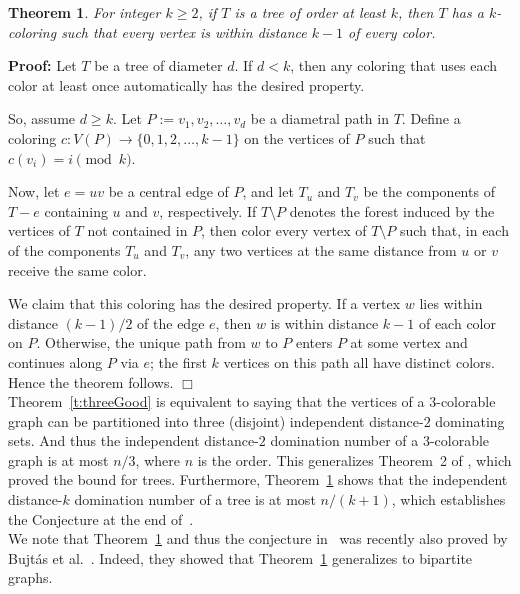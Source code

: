 \documentclass[a4paper,11pt]{article}
\newtheorem{theorem}{Theorem}[section]
\numberwithin{equation}{theorem}
\begin{document}
\begin{theorem}  \label{t:treeGood}
For integer $k\ge 2$,
if $T$ is a tree of order at least $k$, then $T$ has a $k$-coloring 
such that every vertex is within distance $k-1$ of every color.
\end{theorem}

{\bf Proof:} 
Let $T$ be a tree of diameter $d$. If $d < k$, then any coloring that uses each color at least once automatically has the desired property. 

So, assume $d \geq k$. Let $P := v_1, v_2, \ldots, v_d$ be a diametral path in $T$.  
Define a coloring $c : V(P) \to \{0, 1, 2, \ldots, k-1\}$ on the vertices of $P$ such that $c(v_i) = i \pmod{k}$.

Now, let $e = uv$ be a central edge of $P$, and let $T_u$ and $T_v$ be the components of $T - e$ containing $u$ and $v$, respectively.  
If $T \setminus P$ denotes the forest induced by the vertices of $T$ not contained in $P$, then color every vertex of $T \setminus P$ such that, in each of the components $T_u$ and $T_v$, any two vertices at the same distance from $u$ or $v$ receive the same color.

We claim that this coloring has the desired property.  
If a vertex $w$ lies within distance $(k-1)/2$ of the edge $e$, then $w$ is within distance $k-1$ of each color on $P$.  
Otherwise, the unique path from $w$ to $P$ enters $P$ at some vertex and continues along $P$ via $e$; the first $k$ vertices on this path all have distinct colors.  
Hence the theorem follows. \hfill$\Box$\\

Theorem~\ref{t:threeGood} is  equivalent to saying that the vertices of a $3$-colorable graph can be partitioned into 
three (disjoint) independent distance-$2$ dominating sets. And thus the independent distance-$2$ domination
number of a $3$-colorable graph is at most $n/3$, where $n$ is the order.  
This generalizes Theorem~2 of \cite{BH}, which proved the bound for trees.
Furthermore,
Theorem~\ref{t:treeGood} shows that the independent distance-$k$ domination number of a
tree is at most $n/(k+1)$, which establishes the Conjecture at the end of~\cite{BH}.\\

We note that Theorem~\ref{t:treeGood} and thus the conjecture in~\cite{BH} was recently also proved by Bujt\'as et al.~\cite{BCKZ}. Indeed, they showed that 
Theorem~\ref{t:treeGood} generalizes to bipartite graphs.\\
\end{document}
